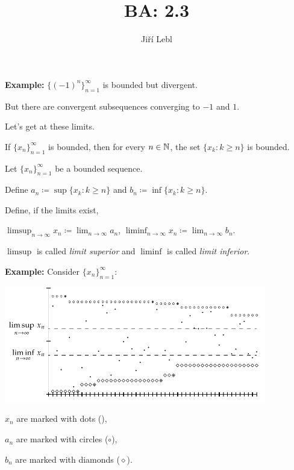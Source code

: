 \documentclass[10pt,aspectratio=169]{beamer}
\author{Ji\v{r}\'i Lebl}
\institute[OSU]{%
Departemento pri Matematiko de Oklahoma {\^S}tata Universitato}
\title{BA: 2.3}
\date{}
\begin{document}
\begin{frame}
\titlepage
\end{frame}

\begin{frame}
\textbf{Example:}
$\bigl\{ {(-1)}^n \bigr\}_{n=1}^\infty$ is bounded but divergent.

\pause
But there are convergent subsequences converging to $-1$ and $1$.

\pause
Let's get at these limits.

\medskip
\pause

If $\{ x_n \}_{n=1}^\infty$ is bounded, then for every $n \in {\mathbb{N}}$, the set $\{ x_k : k \geq n \}$
is bounded.

\pause

\begin{definition}
Let $\{ x_n \}_{n=1}^\infty$ be a bounded sequence.

\medskip
\pause

Define
$a_n \coloneqq \sup \{ x_k : k \geq n \}$ and
$b_n \coloneqq \inf \{ x_k : k \geq n \}$.

\medskip
\pause

Define, if the limits exist,

\medskip

\quad
$\displaystyle
\limsup_{n \to \infty} x_n \coloneqq \lim_{n \to \infty} a_n$,
\qquad
$\displaystyle
\liminf_{n \to \infty} x_n \coloneqq \lim_{n \to \infty} b_n$.
\end{definition}

\pause

$\limsup$ is called \emph{limit superior} and
$\liminf$ is called \emph{limit inferior}.

\end{frame}

\begin{frame}

\textbf{Example:}
Consider $\{x_n\}_{n=1}^\infty$:

\medskip

\includegraphics[width=4.5in]{../figures/sequence-limsupliminf_an_bn}

\medskip

$x_n$ are marked with dots (\raisebox{0.25ex}{\tiny$\bullet$}),

$a_n$ are marked with circles ($\circ$),

$b_n$ are marked with diamonds ($\diamond$).

\end{frame}
\end{document}
